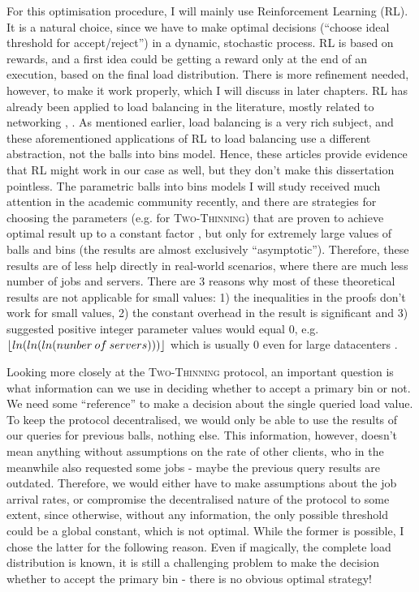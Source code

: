 For this optimisation procedure, I will mainly use Reinforcement Learning (RL). It is a natural choice, since we have to make optimal decisions (``choose ideal threshold for accept/reject'') in a dynamic, stochastic process. RL is based on rewards, and a first idea could be getting a reward only at the end of an execution, based on the final load distribution. There is more refinement needed, however, to make it work properly, which I will discuss in later chapters. RL has already been applied to load balancing in the literature, mostly related to networking \cite{attiah2020RLcellular}, \cite{yeo2021controller}. As mentioned earlier, load balancing is a very rich subject, and these aforementioned applications of RL to load balancing use a different abstraction, not the balls into bins model. Hence, these articles provide evidence that RL might work in our case as well, but they don't make this dissertation pointless. The parametric balls into bins models I will study received much attention in the academic community recently, and there are strategies for choosing the parameters (e.g. for \textsc{Two-Thinning}) that are proven to achieve optimal result up to a constant factor \cite{feldheim2021thinning}, but only for extremely large values of balls and bins (the results are almost exclusively ``asymptotic''). Therefore, these results are of less help directly in real-world scenarios, where there are much less number of jobs and servers. There are $3$ reasons why most of these theoretical results are not applicable for small values: 1) the inequalities in the proofs don't work for small values, 2) the constant overhead in the result is significant and 3) suggested positive integer parameter values would equal $0$, e.g. $\lfloor ln(ln(ln(nunber\: of \: servers)))\rfloor$ which is usually $0$ even for large datacenters \cite{feldheim2021longtermthinning}.


Looking more closely at the \textsc{Two-Thinning} protocol, an important question is what information can we use in deciding whether to accept a primary bin or not. We need some ``reference'' to make a decision about the single queried load value. To keep the protocol decentralised, we would only be able to use the results of our queries for previous balls, nothing else. This information, however, doesn't mean anything without assumptions on the rate of other clients, who in the meanwhile also requested some jobs - maybe the previous query results are outdated. Therefore, we would either have to make assumptions about the job arrival rates, or compromise the decentralised nature of the protocol to some extent, since otherwise, without any information, the only possible threshold could be a global constant, which is not optimal. While the former is possible, I chose the latter for the following reason. Even if magically, the complete load distribution is known, it is still a challenging problem to make the decision whether to accept the primary bin - there is no obvious optimal strategy!


